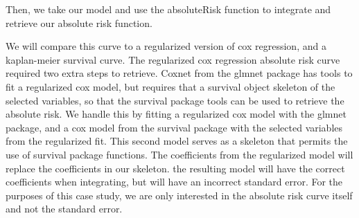 \documentclass[
]{jss}
\begin{document}
Then, we take our model and use the absoluteRisk function to integrate
and retrieve our absolute risk function.

\begin{CodeChunk}

\end{CodeChunk}

We will compare this curve to a regularized version of cox regression,
and a kaplan-meier survival curve. The regularized cox regression
absolute risk curve required two extra steps to retrieve. Coxnet from
the glmnet package has tools to fit a regularized cox model, but
requires that a survival object skeleton of the selected variables, so
that the survival package tools can be used to retrieve the absolute
risk. We handle this by fitting a regularized cox model with the glmnet
package, and a cox model from the survival package with the selected
variables from the regularized fit. This second model serves as a
skeleton that permits the use of survival package functions. The
coefficients from the regularized model will replace the coefficients in
our skeleton. the resulting model will have the correct coefficients
when integrating, but will have an incorrect standard error. For the
purposes of this case study, we are only interested in the absolute risk
curve itself and not the standard error.
\end{document}
